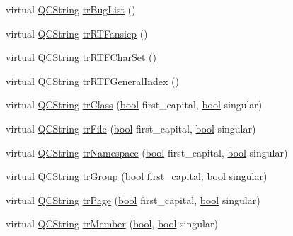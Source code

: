 \begin{DoxyCompactItemize}
\item 
virtual \hyperlink{class_q_c_string}{Q\+C\+String} \hyperlink{class_translator_croatian_a95d42281050b16f36d7e7b260c53f8e3}{tr\+Bug\+List} ()
\item 
virtual \hyperlink{class_q_c_string}{Q\+C\+String} \hyperlink{class_translator_croatian_ac17499fef00a33227b0b863cb3794ffa}{tr\+R\+T\+Fansicp} ()
\item 
virtual \hyperlink{class_q_c_string}{Q\+C\+String} \hyperlink{class_translator_croatian_a1d7d6ab4fe3d62e5eaf1060da020cca2}{tr\+R\+T\+F\+Char\+Set} ()
\item 
virtual \hyperlink{class_q_c_string}{Q\+C\+String} \hyperlink{class_translator_croatian_ad6f887a03290a0f091c66dce049629c0}{tr\+R\+T\+F\+General\+Index} ()
\item 
virtual \hyperlink{class_q_c_string}{Q\+C\+String} \hyperlink{class_translator_croatian_a152e3ac2d8c5f9fe28436d323d15bf8f}{tr\+Class} (\hyperlink{qglobal_8h_a1062901a7428fdd9c7f180f5e01ea056}{bool} first\+\_\+capital, \hyperlink{qglobal_8h_a1062901a7428fdd9c7f180f5e01ea056}{bool} singular)
\item 
virtual \hyperlink{class_q_c_string}{Q\+C\+String} \hyperlink{class_translator_croatian_a963510e90a33b2707c9fffc45ff7cc09}{tr\+File} (\hyperlink{qglobal_8h_a1062901a7428fdd9c7f180f5e01ea056}{bool} first\+\_\+capital, \hyperlink{qglobal_8h_a1062901a7428fdd9c7f180f5e01ea056}{bool} singular)
\item 
virtual \hyperlink{class_q_c_string}{Q\+C\+String} \hyperlink{class_translator_croatian_ab74e2ae74b6acaec10f1cb15f6bb5c4f}{tr\+Namespace} (\hyperlink{qglobal_8h_a1062901a7428fdd9c7f180f5e01ea056}{bool} first\+\_\+capital, \hyperlink{qglobal_8h_a1062901a7428fdd9c7f180f5e01ea056}{bool} singular)
\item 
virtual \hyperlink{class_q_c_string}{Q\+C\+String} \hyperlink{class_translator_croatian_ae2e59a38e3ee83ff4e28a89bc9ec7291}{tr\+Group} (\hyperlink{qglobal_8h_a1062901a7428fdd9c7f180f5e01ea056}{bool} first\+\_\+capital, \hyperlink{qglobal_8h_a1062901a7428fdd9c7f180f5e01ea056}{bool} singular)
\item 
virtual \hyperlink{class_q_c_string}{Q\+C\+String} \hyperlink{class_translator_croatian_ae4121bb290db310efb73193303ae09b3}{tr\+Page} (\hyperlink{qglobal_8h_a1062901a7428fdd9c7f180f5e01ea056}{bool} first\+\_\+capital, \hyperlink{qglobal_8h_a1062901a7428fdd9c7f180f5e01ea056}{bool} singular)
\item 
virtual \hyperlink{class_q_c_string}{Q\+C\+String} \hyperlink{class_translator_croatian_a1926acbe443abf154a47de6138890b03}{tr\+Member} (\hyperlink{qglobal_8h_a1062901a7428fdd9c7f180f5e01ea056}{bool}, \hyperlink{qglobal_8h_a1062901a7428fdd9c7f180f5e01ea056}{bool} singular)

\end{DoxyCompactItemize}
